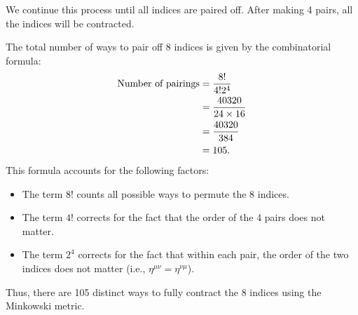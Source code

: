 \begin{enumerate}
    We continue this process until all indices are paired off. After making 4 pairs, all the indices will be contracted.
    
    The total number of ways to pair off 8 indices is given by the combinatorial formula:
    \begin{align}
        \text{Number of pairings} &= \frac{8!}{4! 2^4}\notag\\
        &= \frac{40320}{24 \times 16} \notag\\
        &= \frac{40320}{384} \notag\\
        &= 105.
    \end{align}
    This formula accounts for the following factors:
    \begin{itemize}
        \item The term $8!$ counts all possible ways to permute the 8 indices.
        \item The term $4!$ corrects for the fact that the order of the 4 pairs does not matter.
        \item The term $2^4$ corrects for the fact that within each pair, the order of the two indices does not matter (i.e., $\eta^{\mu\nu} = \eta^{\nu\mu}$).
    \end{itemize}
    Thus, there are 105 distinct ways to fully contract the 8 indices using the Minkowski metric.
\end{enumerate}
\bigskip\bigskip\hline\hline\bigskip